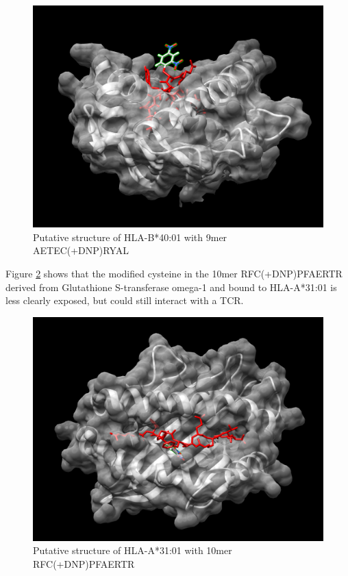 \documentclass[12pt,]{book}
\begin{document}
\begin{figure}

{\centering \includegraphics[width=1\linewidth]{img/b40_keratin_dnp_top_2} 

}

\caption{Putative structure of HLA-B*40:01 with 9mer
AETEC(+DNP)RYAL}\label{fig:keratin-mhc}
\end{figure}

Figure \ref{fig:glut-mhc} shows that the modified cysteine in the 10mer
RFC(+DNP)PFAERTR derived from Glutathione S-transferase omega-1 and
bound to HLA-A*31:01 is less clearly exposed, but could still interact
with a TCR.




\begin{figure}

{\centering \includegraphics[width=1\linewidth]{img/a31_glut_dnp_top} 

}

\caption{Putative structure of HLA-A*31:01 with 10mer
RFC(+DNP)PFAERTR}\label{fig:glut-mhc}
\end{figure}
\end{document}
